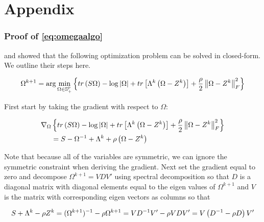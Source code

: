 \documentclass[11pt,]{report}
\theoremstyle{definition}
\theoremstyle{definition}
\theoremstyle{definition}
\theoremstyle{remark}
\begin{document}
\hypertarget{appendix-appendix}{%
\appendix}


\hypertarget{appendix}{%
\chapter{Appendix}\label{appendix}}

\hypertarget{proofomegaalgo}{%
\subsection{Proof of \eqref{eq:omegaalgo}}\label{proofomegaalgo}}

\citet{witten2009covariance} and \citet{price2015ridge} showed that the following optimization problem can be solved in closed-form. We outline their steps here.

\begin{equation}
\Omega^{k + 1} = \arg\min_{\Omega \in \mathbb{S}_{+}^{p}}\left\{ tr\left(S\Omega\right) - \log\left|\Omega\right| + tr\left[\Lambda^{k}\left(\Omega - Z^{k}\right)\right] + \frac{\rho}{2}\left\| \Omega - Z^{k} \right\|_{F}^{2} \right\}
\label{eq:appendixomegaloglik}\notag
\end{equation}

First start by taking the gradient with respect to \(\Omega\):

\begin{equation}
\begin{split}
  \nabla_{\Omega}&\left\{ tr\left(S\Omega\right) - \log\left|\Omega\right| + tr\left[\Lambda^{k}\left(\Omega - Z^{k}\right)\right] + \frac{\rho}{2}\left\| \Omega - Z^{k} \right\|_{F}^{2} \right\} \\
  &= S - \Omega^{-1} + \Lambda^{k} + \rho\left( \Omega - Z^{k} \right)
\label{eq:appendixomegagradient}\notag
\end{split}
\end{equation}

Note that because all of the variables are symmetric, we can ignore the symmetric constraint when deriving the gradient. Next set the gradient equal to zero and decompose \(\Omega^{k + 1} = VDV'\) using spectral decomposition so that \(D\) is a diagonal matrix with diagonal elements equal to the eigen values of \(\Omega^{k + 1}\) and \(V\) is the matrix with corresponding eigen vectors as columns so that

\begin{equation}
S + \Lambda^{k} - \rho Z^{k} = (\Omega^{k + 1})^{-1} - \rho \Omega^{k + 1} = VD^{-1}V' - \rho VDV' =  V\left(D^{-1} - \rho D\right)V'\notag
\end{equation}
\end{document}
